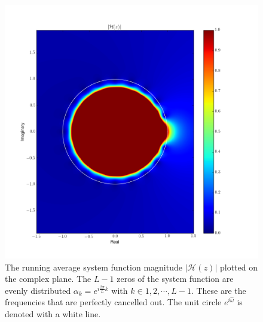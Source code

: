 \begin{figure}
\begin{center}
\includegraphics[width=\textwidth]{ch18/figures/zcol2.png}
\end{center}
\caption{The running average system function magnitude
  $|\mathcal{H}(z)|$ plotted on the complex plane. The $L-1$ zeros of
  the system function are evenly distributed
  $\alpha_k=e^{i\frac{2\pi}{L}k}$ with $k\in {1,2,\cdots,L-1}$. These
  are the frequencies that are perfectly cancelled out. The unit
  circle $e^{i\hat{\omega}}$ is denoted with a white line.}
\label{fig:rma_l20}
\end{figure}



